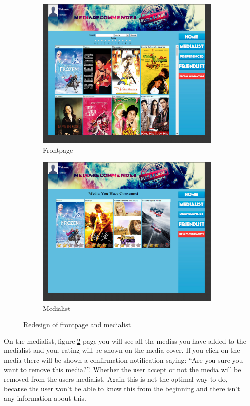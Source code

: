 \begin{figure}[H]
\centering
\begin{subfigure}{.5\textwidth}
  \centering
  \includegraphics[width=.9\linewidth]{Images/new-home.jpg}
  \caption{Frontpage}
  \label{fig:new-frontpage}
\end{subfigure}%
\begin{subfigure}{.5\textwidth}
  \centering
  \includegraphics[width=.9\linewidth]{Images/new-medialist.jpg}
  \caption{Medialist}
  \label{fig:new-medialist}
\end{subfigure}
\caption{Redesign of frontpage and medialist}
\label{fig:front-media}
\end{figure}

On the medialist, figure \ref{fig:new-medialist} page you will see all the medias you have added to the medialist and your rating will be shown on the media cover. If you click on the media there will be shown a confirmation notification saying: “Are you sure you want to remove this media?”. Whether the user accept or not the media will be removed from the users medialist. Again this is not the optimal way to do, because the user won't be able to know this from the beginning and there isn't any information about this.

